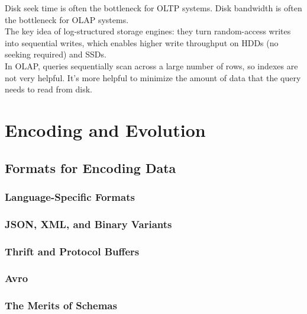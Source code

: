 \documentclass[12pt, titlepage]{article}
\begin{document}
Disk seek time is often the bottleneck for OLTP systems. Disk bandwidth is often the bottleneck for OLAP systems. \\

The key idea of log-structured storage engines: they turn random-access writes into sequential writes, which enables higher write throughput on HDDs (no seeking required) and SSDs. \\

In OLAP, queries sequentially scan across a large number of rows, so indexes are not very helpful. It's more helpful to minimize the amount of data that the query needs to read from disk.

\section{Encoding and Evolution}



\subsection{Formats for Encoding Data}



\subsubsection{Language-Specific Formats}



\subsubsection{JSON, XML, and Binary Variants}



\subsubsection{Thrift and Protocol Buffers}



\subsubsection{Avro}



\subsubsection{The Merits of Schemas}
\end{document}
